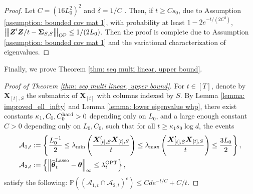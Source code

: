 \documentclass[aos,preprint]{imsart}
\theoremstyle{plain}
\theoremstyle{definition}
\newcommand{\btheta}{\boldsymbol{\theta}}
\newcommand{\hbtheta}{\widehat{\boldsymbol{\theta}}}
\newcommand{\bX}{\boldsymbol{X}}
\newcommand{\bSigma}{\boldsymbol{\Sigma}}
\newcommand{\op}[1]{{\left\vert\kern-0.25ex\left\vert\kern-0.25ex\left\vert #1\right\vert\kern-0.25ex\right\vert\kern-0.25ex\right\vert}}
\newcommand{\lmin}[1]{\lambda_{\min}\left(#1\right)}
\newcommand{\lmax}[1]{\lambda_{\max}\left(#1\right)}
\newcommand{\ltheta}{\hbtheta^{\textup{Lasso}}}
\newcommand{\hdlambda}{\lambda^{\textup{OPT}}}
\newcommand{\bZ}{\boldsymbol{Z}}
\newcommand{\Pro}{\mathbb{P}}
\begin{document}
\begin{appendix}
\begin{proof}
Let $C =  (16L_0^2)^2$ and $\delta = 1/C$ . Then, if $t \geq Cs_0$, due to Assumption \ref{assumption: bounded cov mat 1}, with probability at least $1-2e^{-t/(2C^2)}$,
$\op{{\bZ'\bZ}/{t}-\bSigma_{S,S}}_{\textup{OP}} \leq 1/(2L_0)$. Then the proof is complete due to Assumption \ref{assumption: bounded cov mat 1} and the variational characterization of eigenvalues.
\end{proof}


Finally, we prove Theorem \ref{thm: seq multi linear, upper bound}.

\begin{proof}[Proof of Theorem \ref{thm: seq multi linear, upper bound}]
For $t \in [T]$, denote by $\bX_{[t],S}$  the submatrix of $\bX_{[t]}$ with columns indexed by $S$. 
By Lemma \ref{lemma: improved_ell_infty} and Lemma  \ref{lemma: lower eigenvalue whp}, there exist constants $\kappa_1, C_0, C_0^{\textup{hard}}>0$ depending only on $L_0$, and a large enough constant $C>0$ depending only on $ L_0, C_0$, such that for all $t\ge \kappa_1 s_0\log d$, the events
\begin{align*}
    \mathcal{A}_{1,t} &:=\left\{\frac{L_0^{-1}}{2} \le \lmin{\frac{\bX_{[t],S}'\bX_{[t],S}}{t}} \le \lmax{\frac{\bX_{[t],S}'\bX_{[t],S}}{t}}\le \frac{3L_0}{2} \right\}, \\
    \mathcal{A}_{2,t} &:=\left\{\left\|\ltheta_t -\btheta \right\|_{\infty} \le \hdlambda_t \right\},
\end{align*}
satisfy the following:
$\Pro\left((\mathcal{A}_{1,t} \cap \mathcal{A}_{2,t})^c\right)\le Cde^{-t/C} + C/t$.


\end{proof}
\end{appendix}
\end{document}
